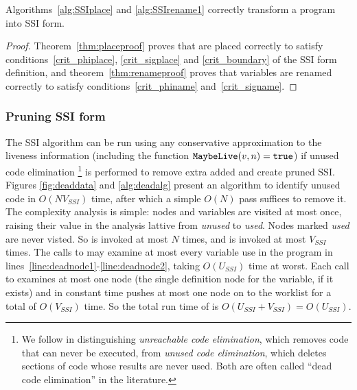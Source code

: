 \documentclass[12pt,titlepage,twoside]{article}
\begin{document}
\begin{theorem}
Algorithms~\ref{alg:SSIplace} and \ref{alg:SSIrename1} correctly
transform a program into SSI form.
\end{theorem}
\begin{proof}
Theorem~\ref{thm:placeproof} proves that  are placed
correctly to satisfy conditions~\ref{crit_phiplace},
\ref{crit_sigplace} and \ref{crit_boundary} of the SSI form
definition, and theorem~\ref{thm:renameproof} proves that variables
are renamed correctly to satisfy conditions~\ref{crit_phiname}
and~\ref{crit_signame}.
\end{proof}

\subsubsection{Pruning SSI form}\label{sec:unusedcode}
The SSI algorithm can be run using any conservative approximation to
the liveness information
(including the function $\texttt{MaybeLive}(v, n)=\texttt{true}$) if
unused code elimination%
\footnote{We follow \cite{wegman91:scc} in distinguishing
\emph{unreachable code elimination}, which removes code that can never
be executed, from \emph{unused code elimination}, which deletes
sections of code whose results are never used.  Both are often called
``dead code elimination'' in the literature.} is performed to remove
extra  added and create pruned SSI.
Figures \ref{fig:deaddata} and
\ref{alg:deadalg} present an algorithm to identify unused code in
$O(N V_{SSI})$ time, after which a simple $O(N)$ pass suffices to remove it.
The complexity analysis is simple: nodes and variables are visited at
most once, raising their value in the analysis lattive from
\emph{unused} to \emph{used}.  Nodes marked \emph{used} are never
visted.  So  is invoked at most $N$ times, and
 is invoked at most $V_{SSI}$ times.  The calls to
 may examine at most every variable use in the
program in lines~\ref{line:deadnode1}-\ref{line:deadnode2}, taking
$O(U_{SSI})$ time at worst. Each call
to  examines at most one node (the single
definition node for the variable, if it exists) and in constant time
pushes at most one node on to the worklist for a total of $O(V_{SSI})$ time.
So the total run time of  is
$O(U_{SSI}+V_{SSI})=O(U_{SSI})$.
\end{document}
